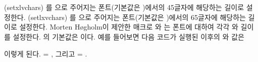 \begin{syntax}
\cmd{\setxlvchars} \\
\cmd{\setlxvchars} \\
\end{syntax}
\glossary(setxlvchars)%
  {}%
  {를 으로 주어지는 폰트(기본값은 )에서의 45글자에 해당하는 길이로 설정한다.}
\glossary(setlxvchars)%
  {}%
  {를 으로 주어지는 폰트(기본값은 )에서의 65글자에 해당하는 길이로 설정한다.}
Morten H{\o}gholm이 제안한 매크로
\cmd{\setxlvchars}와 \cmd{\setlxvchars}는  폰트에
대하여 각각 \lnc{\xlvchars}와 \lnc{\lxvchars} 길이를 설정한다.
의 기본값은 \cmd{\normalfont}이다.
예를 들어보면 다음 코드가 실행된 이후의 \lnc{\lxvchars}와 \lnc{\xlvchars} 값은
\begin{lcode}
\setlxvchars \setxlvchars[\small\sffamily]
\end{lcode}
\begingroup
이렇게 된다.
\setlxvchars\setxlvchars[\small\sffamily]
\lnc{\lxvchars} = \the\lxvchars
, 그리고
\lnc{\xlvchars} = \the\xlvchars.
\endgroup

